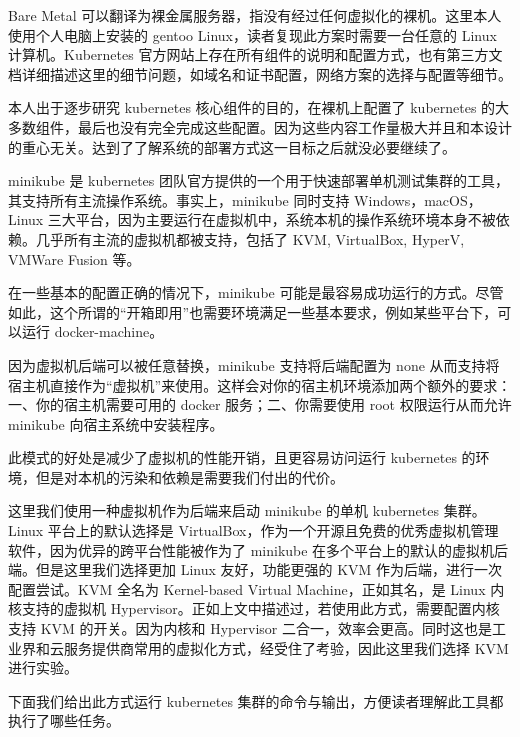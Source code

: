 
Bare Metal 可以翻译为裸金属服务器，指没有经过任何虚拟化的裸机。这里本人使用个人电脑上安装的 gentoo Linux，读者复现此方案时需要一台任意的 Linux 计算机。Kubernetes 官方网站上存在所有组件的说明和配置方式，也有第三方文档详细描述这里的细节问题，如域名和证书配置，网络方案的选择与配置等细节。

本人出于逐步研究 kubernetes 核心组件的目的，在裸机上配置了 kubernetes 的大多数组件，最后也没有完全完成这些配置。因为这些内容工作量极大并且和本设计的重心无关。达到了了解系统的部署方式这一目标之后就没必要继续了。



minikube 是 kubernetes 团队官方提供的一个用于快速部署单机测试集群的工具，其支持所有主流操作系统。事实上，minikube 同时支持 Windows，macOS，Linux 三大平台，因为主要运行在虚拟机中，系统本机的操作系统环境本身不被依赖。几乎所有主流的虚拟机都被支持，包括了 KVM, VirtualBox, HyperV, VMWare Fusion 等。

在一些基本的配置正确的情况下，minikube 可能是最容易成功运行的方式。尽管如此，这个所谓的“开箱即用”也需要环境满足一些基本要求，例如某些平台下，可以运行 docker-machine。

因为虚拟机后端可以被任意替换，minikube 支持将后端配置为 none 从而支持将宿主机直接作为“虚拟机”来使用。这样会对你的宿主机环境添加两个额外的要求：一、你的宿主机需要可用的 docker 服务；二、你需要使用 root 权限运行从而允许 minikube 向宿主系统中安装程序。

此模式的好处是减少了虚拟机的性能开销，且更容易访问运行 kubernetes 的环境，但是对本机的污染和依赖是需要我们付出的代价。


这里我们使用一种虚拟机作为后端来启动 minikube 的单机 kubernetes 集群。Linux 平台上的默认选择是 VirtualBox，作为一个开源且免费的优秀虚拟机管理软件，因为优异的跨平台性能被作为了 minikube 在多个平台上的默认的虚拟机后端。但是这里我们选择更加 Linux 友好，功能更强的 KVM 作为后端，进行一次配置尝试。KVM 全名为 Kernel-based Virtual Machine，正如其名，是 Linux 内核支持的虚拟机 Hypervisor。正如上文中描述过，若使用此方式，需要配置内核支持 KVM 的开关。因为内核和 Hypervisor 二合一，效率会更高。同时这也是工业界和云服务提供商常用的虚拟化方式，经受住了考验，因此这里我们选择 KVM 进行实验。

下面我们给出此方式运行 kubernetes 集群的命令与输出，方便读者理解此工具都执行了哪些任务。

